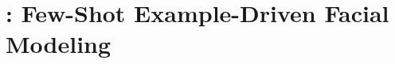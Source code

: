\chapter{\blendfields: Few-Shot Example-Driven Facial Modeling}
\label{chap:blendfields}

 \blendfieldsteaserfigure







